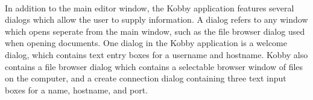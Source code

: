 \documentclass[11pt]{article}
\begin{document}
\paragraph{}In addition to the main editor window, the Kobby application features several dialogs which allow the user to supply information.  A dialog refers to any window which opens seperate from the main window, such as the file browser dialog used when opening documents.  One dialog in the Kobby application is a welcome dialog, which contains text entry boxes for a username and hostname.  Kobby also contains a file browser dialog which contains a selectable browser window of files on the computer, and a create connection dialog containing three text input boxes for a name, hostname, and port.
\end{document}
